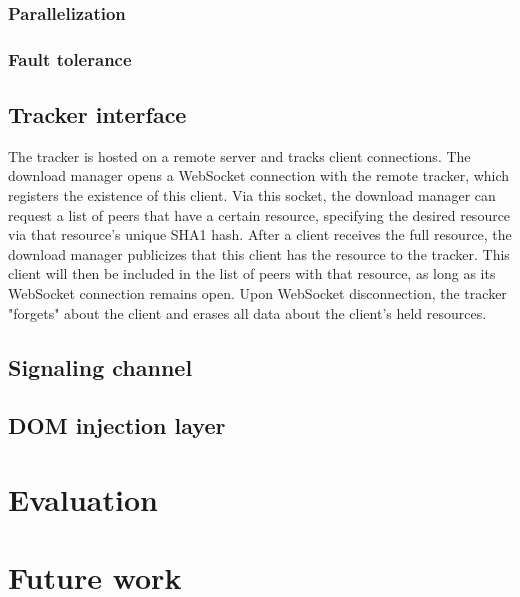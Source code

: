 \documentclass[letterpaper,twocolumn,10pt]{article}
\begin{document}

\subsubsection{Parallelization}


\subsubsection{Fault tolerance}


\subsection{Tracker interface}

The tracker is hosted on a remote server and tracks client connections. The download manager opens a WebSocket connection with the remote tracker, which registers the existence of this client. Via this socket, the download manager can request a list of peers that have a certain resource, specifying the desired resource via that resource's unique SHA1 hash. After a client receives the full resource, the download manager publicizes that this client has the resource to the tracker. This client will then be included in the list of peers with that resource, as long as its WebSocket connection remains open. Upon WebSocket disconnection, the tracker "forgets" about the client and erases all data about the client's held resources.

\subsection{Signaling channel}


\subsection{DOM injection layer}


\section{Evaluation}


\section{Future work}
\end{document}
